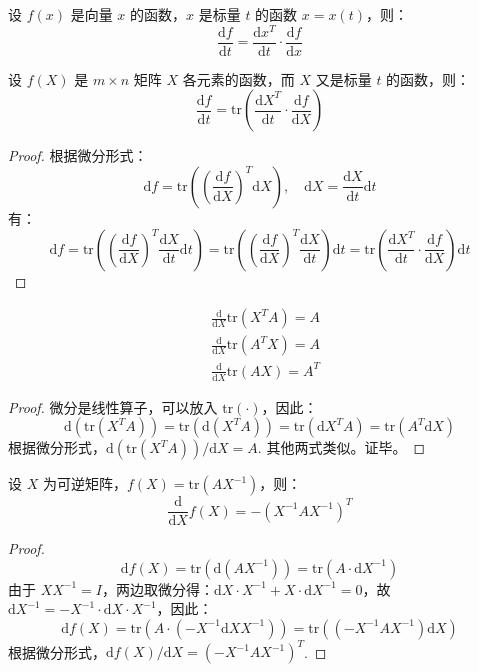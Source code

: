 \begin{property}[链式法则]
设 $f(x)$ 是向量 $x$ 的函数，$x$ 是标量 $t$ 的函数 $x=x(t)$，则：
\[
    \frac{\mathrm df}{\mathrm dt}=\frac{\mathrm dx^T}{\mathrm dt}\cdot\frac{\mathrm df}{\mathrm dx}
\]
\end{property}
\begin{property}[链式法则]
设 $f(X)$ 是 $m\times n$ 矩阵 $X$ 各元素的函数，而 $X$ 又是标量 $t$ 的函数，则：
\[
    \frac{\mathrm df}{\mathrm dt}=\mathrm{tr}\left(\frac{\mathrm dX^T}{\mathrm dt}\cdot\frac{\mathrm df}{\mathrm dX}\right)
\]
\end{property}
\begin{proof}
根据微分形式：
\[
    \mathrm df=\mathrm{tr}\left(\left(\frac{\mathrm df}{\mathrm dX}\right)^T\mathrm dX\right),\quad \mathrm dX=\frac{\mathrm dX}{\mathrm dt}\mathrm dt
\]
有：
\[
    \mathrm df=\mathrm{tr}\left(\left(\frac{\mathrm df}{\mathrm dX}\right)^T\frac{\mathrm dX}{\mathrm dt}\mathrm dt\right)=\mathrm{tr}\left(\left(\frac{\mathrm df}{\mathrm dX}\right)^T\frac{\mathrm dX}{\mathrm dt}\right)\mathrm dt=\mathrm{tr}\left(\frac{\mathrm dX^T}{\mathrm dt}\cdot\frac{\mathrm df}{\mathrm dX}\right)\mathrm dt
\]
\end{proof}

\begin{example}[迹函数的导数]
\begin{align*}
    &\frac{\mathrm d}{\mathrm dX}\mathrm{tr}(X^TA)=A\\
    &\frac{\mathrm d}{\mathrm dX}\mathrm{tr}(A^TX)=A\\
    &\frac{\mathrm d}{\mathrm dX}\mathrm{tr}(AX)=A^T
\end{align*}
\end{example}
\begin{proof}
微分是线性算子，可以放入 $\mathrm{tr}(\cdot)$，因此：
\[
    \mathrm d(\mathrm{tr}(X^TA))=\mathrm{tr}(\mathrm d(X^TA))=\mathrm{tr}(\mathrm dX^T A)=\mathrm{tr}(A^T\mathrm dX)
\]
根据微分形式，$\mathrm d(\mathrm{tr}(X^TA))/\mathrm dX=A$.  其他两式类似。证毕。
\end{proof}
\begin{example}
设 $X$ 为可逆矩阵，$f(X)=\mathrm{tr}(AX^{-1})$，则：
\[
    \frac{\mathrm d}{\mathrm dX}f(X)=-(X^{-1}AX^{-1})^T
\]
\end{example}
\begin{proof}
\[
    \mathrm df(X)=\mathrm{tr}(\mathrm d(AX^{-1}))=\mathrm{tr}(A\cdot\mathrm dX^{-1})
\]
由于 $XX^{-1}=I$，两边取微分得：$\mathrm dX\cdot X^{-1}+X\cdot\mathrm dX^{-1}=0$，故 $\mathrm dX^{-1}=-X^{-1}\cdot\mathrm dX\cdot X^{-1}$，因此：
\[
    \mathrm df(X)=\mathrm{tr}\left(A\cdot(-X^{-1}\mathrm dX X^{-1})\right)=\mathrm{tr}\left((-X^{-1}AX^{-1})\mathrm dX\right)
\]
根据微分形式，$\mathrm df(X)/\mathrm dX=(-X^{-1}AX^{-1})^T$.
\end{proof}

